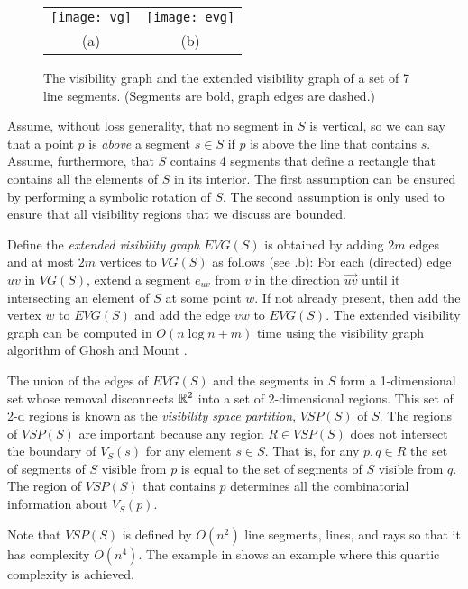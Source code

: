 \documentclass{patmorin}
\newcommand{\VG}{\mathit{VG}}
\newcommand{\EVG}{\mathit{EVG}}
\newcommand{\VSP}{\mathit{VSP}}
\begin{document}
\begin{figure}
  \begin{center}
    \begin{tabular}{cc}
    \texttt{[image: vg]} & \texttt{[image: evg]} \\
    (a) & (b)
    \end{tabular}
  \end{center}
  \caption{The visibility graph and the extended visibility graph of a set
       of 7 line segments. (Segments are bold, graph edges are dashed.)}
\end{figure}

Assume, without loss generality, that no segment in $S$ is vertical, so
we can say that a point $p$ is \emph{above} a segment $s\in S$ if $p$ is
above the line that contains $s$.  Assume, furthermore, that $S$ contains
4 segments that define a rectangle that contains all the elements of $S$
in its interior.  The first assumption can be ensured by performing a
symbolic rotation of $S$.  The second assumption is only used to ensure
that all visibility regions that we discuss are bounded.

Define the \emph{extended visibility graph} $\EVG(S)$ is obtained
by adding $2m$ edges and at most $2m$ vertices to $\VG(S)$ as follows
(see .b): For each (directed) edge $uv$ in $\VG(S)$, extend a
segment $e_{uv}$ from $v$ in the direction $\overrightarrow{uv}$ until it
intersecting an element of $S$ at some point $w$.  If not already present,
then add the vertex $w$ to $\EVG(S)$ and add the edge $vw$ to $\EVG(S)$.
The extended visibility graph can be computed in $O(n\log n + m)$ time
using the visibility graph algorithm of Ghosh and Mount \cite{gm91}.

The union of the edges of $\EVG(S)$ and the segments in $S$ form a
1-dimensional set whose removal disconnects $\mathbb{R}^2$ into a set of
2-dimensional regions.  This set of 2-d regions is known as the
\emph{visibility space partition}, $\VSP(S)$ of $S$.  The regions
of $\VSP(S)$ are important because any region $R\in\VSP(S)$ does not
intersect the boundary of $V_S(s)$ for any element $s\in S$. That is,
for any $p,q\in R$ the set of segments of $S$ visible from $p$ is equal to
the set of segments of $S$ visible from $q$.  The region of $\VSP(S)$ that
contains $p$ determines all the combinatorial information about $V_S(p)$.

Note that $\VSP(S)$ is defined by $O(n^2)$ line segments, lines, and rays
so that it has complexity $O(n^4)$.  The example in  shows
an example where this quartic complexity is achieved.
\end{document}

